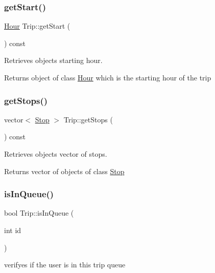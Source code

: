 \subsubsection{\texorpdfstring{get\+Start()}{getStart()}}
{\footnotesize\ttfamily \hyperlink{class_hour}{Hour} Trip\+::get\+Start (\begin{DoxyParamCaption}{ }\end{DoxyParamCaption}) const}



Retrieves object\textquotesingle{}s starting hour. 

\begin{DoxyReturn}{Returns}
object of class \hyperlink{class_hour}{Hour} which is the starting hour of the trip 
\end{DoxyReturn}
\mbox{\label{group___trip_gae081fb958af544c9cad9002d5696fb33}} 
\subsubsection{\texorpdfstring{get\+Stops()}{getStops()}}
{\footnotesize\ttfamily vector$<$ \hyperlink{class_stop}{Stop} $>$ Trip\+::get\+Stops (\begin{DoxyParamCaption}{ }\end{DoxyParamCaption}) const}



Retrieves object\textquotesingle{}s vector of stops. 

\begin{DoxyReturn}{Returns}
vector of objects of class \hyperlink{class_stop}{Stop} 
\end{DoxyReturn}
\mbox{\label{group___trip_gaa704cf099858e8de479f6fdd6229008f}} 
\subsubsection{\texorpdfstring{is\+In\+Queue()}{isInQueue()}}
{\footnotesize\ttfamily bool Trip\+::is\+In\+Queue (\begin{DoxyParamCaption}\item[{int}]{id }\end{DoxyParamCaption})}



verifyes if the user is in this trip queue 


